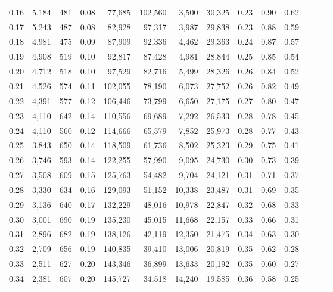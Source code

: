 \begin{tabular}{rrrrrrrrrrrrrr}
0.16 &  5,184 &  481 &  0.08 &   77,685 &  102,560 &   3,500 &  30,325 &  0.23 &  0.90 &      0.62 \\
0.17 &  5,243 &  487 &  0.08 &   82,928 &   97,317 &   3,987 &  29,838 &  0.23 &  0.88 &      0.59 \\
0.18 &  4,981 &  475 &  0.09 &   87,909 &   92,336 &   4,462 &  29,363 &  0.24 &  0.87 &      0.57 \\
0.19 &  4,908 &  519 &  0.10 &   92,817 &   87,428 &   4,981 &  28,844 &  0.25 &  0.85 &      0.54 \\
0.20 &  4,712 &  518 &  0.10 &   97,529 &   82,716 &   5,499 &  28,326 &  0.26 &  0.84 &      0.52 \\
0.21 &  4,526 &  574 &  0.11 &  102,055 &   78,190 &   6,073 &  27,752 &  0.26 &  0.82 &      0.49 \\
0.22 &  4,391 &  577 &  0.12 &  106,446 &   73,799 &   6,650 &  27,175 &  0.27 &  0.80 &      0.47 \\
0.23 &  4,110 &  642 &  0.14 &  110,556 &   69,689 &   7,292 &  26,533 &  0.28 &  0.78 &      0.45 \\
0.24 &  4,110 &  560 &  0.12 &  114,666 &   65,579 &   7,852 &  25,973 &  0.28 &  0.77 &      0.43 \\
0.25 &  3,843 &  650 &  0.14 &  118,509 &   61,736 &   8,502 &  25,323 &  0.29 &  0.75 &      0.41 \\
0.26 &  3,746 &  593 &  0.14 &  122,255 &   57,990 &   9,095 &  24,730 &  0.30 &  0.73 &      0.39 \\
0.27 &  3,508 &  609 &  0.15 &  125,763 &   54,482 &   9,704 &  24,121 &  0.31 &  0.71 &      0.37 \\
0.28 &  3,330 &  634 &  0.16 &  129,093 &   51,152 &  10,338 &  23,487 &  0.31 &  0.69 &      0.35 \\
0.29 &  3,136 &  640 &  0.17 &  132,229 &   48,016 &  10,978 &  22,847 &  0.32 &  0.68 &      0.33 \\
0.30 &  3,001 &  690 &  0.19 &  135,230 &   45,015 &  11,668 &  22,157 &  0.33 &  0.66 &      0.31 \\
0.31 &  2,896 &  682 &  0.19 &  138,126 &   42,119 &  12,350 &  21,475 &  0.34 &  0.63 &      0.30 \\
0.32 &  2,709 &  656 &  0.19 &  140,835 &   39,410 &  13,006 &  20,819 &  0.35 &  0.62 &      0.28 \\
0.33 &  2,511 &  627 &  0.20 &  143,346 &   36,899 &  13,633 &  20,192 &  0.35 &  0.60 &      0.27 \\
0.34 &  2,381 &  607 &  0.20 &  145,727 &   34,518 &  14,240 &  19,585 &  0.36 &  0.58 &      0.25 \\

\end{tabular}
